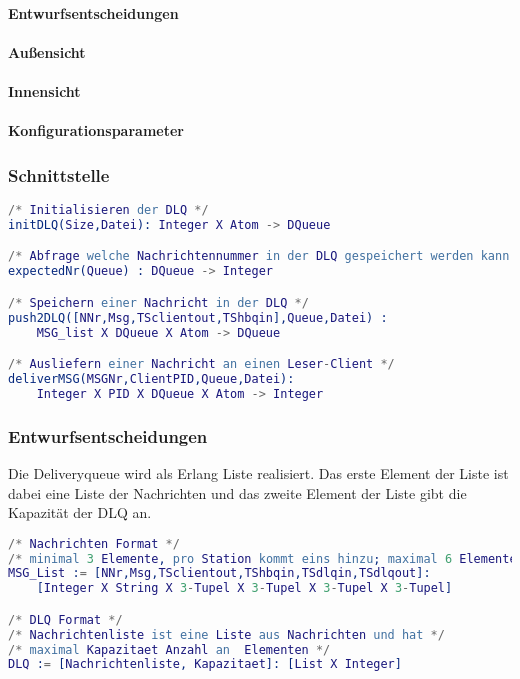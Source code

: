\documentclass{article}
\begin{document}
			\paragraph{Entwurfsentscheidungen}
			\paragraph{Außensicht}
			\paragraph{Innensicht}
			\paragraph{Konfigurationsparameter}
				

\subsubsection{Schnittstelle}
\begin{lstlisting}[language=erlang]
/* Initialisieren der DLQ */
initDLQ(Size,Datei): Integer X Atom -> DQueue

/* Abfrage welche Nachrichtennummer in der DLQ gespeichert werden kann */
expectedNr(Queue) : DQueue -> Integer

/* Speichern einer Nachricht in der DLQ */
push2DLQ([NNr,Msg,TSclientout,TShbqin],Queue,Datei) :
    MSG_list X DQueue X Atom -> DQueue

/* Ausliefern einer Nachricht an einen Leser-Client */
deliverMSG(MSGNr,ClientPID,Queue,Datei):
    Integer X PID X DQueue X Atom -> Integer
\end{lstlisting}

\subsubsection{Entwurfsentscheidungen}
Die Deliveryqueue wird als Erlang Liste realisiert. Das erste Element der Liste ist dabei eine Liste der Nachrichten und das zweite Element der Liste gibt die Kapazität der DLQ an.
\begin{lstlisting}[language=erlang]
/* Nachrichten Format */
/* minimal 3 Elemente, pro Station kommt eins hinzu; maximal 6 Elemente */
MSG_List := [NNr,Msg,TSclientout,TShbqin,TSdlqin,TSdlqout]:
    [Integer X String X 3-Tupel X 3-Tupel X 3-Tupel X 3-Tupel]

/* DLQ Format */
/* Nachrichtenliste ist eine Liste aus Nachrichten und hat */
/* maximal Kapazitaet Anzahl an  Elementen */
DLQ := [Nachrichtenliste, Kapazitaet]: [List X Integer]
\end{lstlisting}
\end{document}
